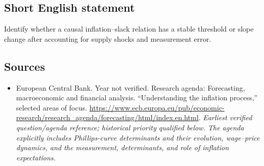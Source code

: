 \documentclass[11pt]{article}
\begin{document}
\subsection{Short English statement}
Identify whether a causal inflation–slack relation has a stable threshold or slope change after accounting for supply shocks and measurement error.

\subsection{Sources}
\begin{itemize}\raggedright
\item[\textnormal{[S1]}]\hypertarget{source:30007523:1}{} European Central Bank. Year not verified. Research agenda: Forecasting, macroeconomic and financial analysis. “Understanding the inflation process,” selected areas of focus.
\url{https://www.ecb.europa.eu/pub/economic-research/research_agenda/forecasting/html/index.en.html}.
{\small\textit{Earliest verified question/agenda reference; historical priority qualified below. The agenda explicitly includes Phillips-curve determinants and their evolution, wage–price dynamics, and the measurement, determinants, and role of inflation expectations.}}
\end{itemize}
\end{document}
